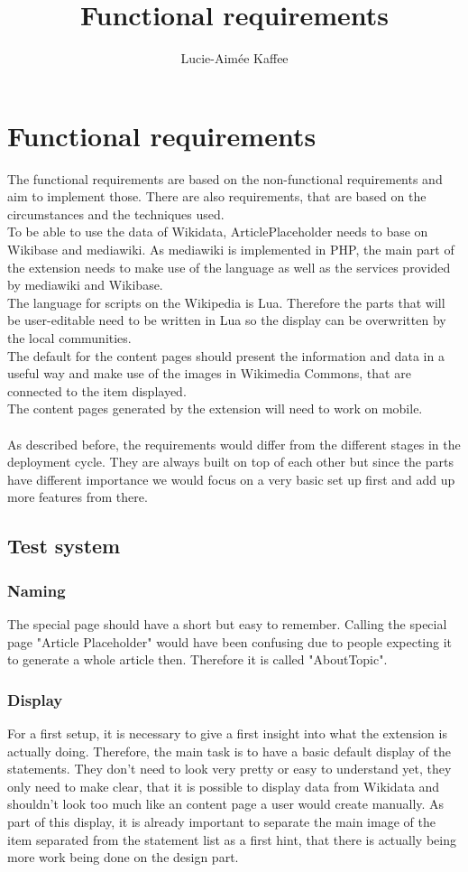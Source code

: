 \documentclass[11pt]{article}
\title {{Functional requirements}}
\author {Lucie-Aim\'{e}e Kaffee}
\date{}
\begin{document}
\section {Functional requirements}
The functional requirements are based on the non-functional requirements and aim to implement those.
There are also requirements, that are based on the circumstances and the techniques used. \\
To be able to use the data of Wikidata, ArticlePlaceholder needs to base on Wikibase and mediawiki.
As mediawiki is implemented in PHP, the main part of the extension needs to make use of the language as well as the services provided by mediawiki and Wikibase. \\
The language for scripts on the Wikipedia is Lua. Therefore the parts that will be user-editable need to be written in Lua so the display can be overwritten by the local communities. \\
The default for the content pages should present the information and data in a useful way and make use of the images in Wikimedia Commons, that are connected to the item displayed.\\
The content pages generated by the extension will need to work on mobile. \\
\\
As described before, the requirements would differ from the different stages in the deployment cycle. They are always built on top of each other but since the parts have different importance we would focus on a very basic set up first and add up more features from there. 

\subsection{Test system}
\subsubsection{Naming}
The special page should have a short but easy to remember. Calling the special page "Article Placeholder" would have been confusing due to people expecting it to generate a whole article then. Therefore it is called "AboutTopic".
\subsubsection{Display}
For a first setup, it is necessary to give a first insight into what the extension is actually doing. Therefore, the main task is to have a basic default display of the statements. They don't need to look very pretty or easy to understand yet, they only need to make clear, that it is possible to display data from Wikidata and shouldn't look too much like an content page a user would create manually. As part of this display, it is already important to separate the main image of the item separated from the statement list as a first hint, that there is actually being more work being done on the design part. \\
\end{document}
